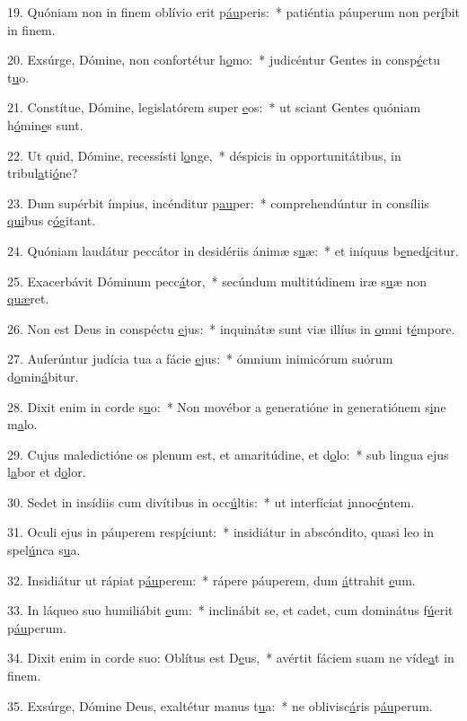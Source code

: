 19. Quóniam non in finem oblívio erit p\uline{áu}peris:~* patiéntia páuperum non per\uline{í}bit in f\uline{i}nem.\par 
20. Exsúrge, Dómine, non confortétur h\uline{o}mo:~* judicéntur Gentes in consp\uline{é}ctu t\uline{u}o.\par 
21. Constítue, Dómine, legislatórem super \uline{e}os:~* ut sciant Gentes quóniam h\uline{ó}min\uline{e}s sunt.\par 
22. Ut quid, Dómine, recessísti l\uline{o}nge,~* déspicis in opportunitátibus, in tribul\uline{a}ti\uline{ó}ne?\par 
23. Dum supérbit ímpius, incénditur p\uline{au}per:~* comprehendúntur in consíliis \uline{qui}bus c\uline{ó}gitant.\par 
24. Quóniam laudátur peccátor in desidériis ánimæ s\uline{u}æ:~* et iníquus b\uline{e}ned\uline{í}citur.\par 
25. Exacerbávit Dóminum pecc\uline{á}tor,~* secúndum multitúdinem iræ s\uline{u}æ non \uline{quæ}ret.\par 
26. Non est Deus in conspéctu \uline{e}jus:~* inquinátæ sunt viæ illíus in \uline{o}mni t\uline{é}mpore.\par 
27. Auferúntur judícia tua a fácie \uline{e}jus:~* ómnium inimicórum suórum d\uline{o}min\uline{á}bitur.\par 
28. Dixit enim in corde s\uline{u}o:~* Non movébor a generatióne in generatiónem s\uline{i}ne m\uline{a}lo.\par 
29. Cujus maledictióne os plenum est, et amaritúdine, et d\uline{o}lo:~* sub lingua ejus l\uline{a}bor et d\uline{o}lor.\par 
30. Sedet in insídiis cum divítibus in occ\uline{ú}ltis:~* ut interfíciat \uline{i}nnoc\uline{é}ntem.\par 
31. Oculi ejus in páuperem resp\uline{í}ciunt:~* insidiátur in abscóndito, quasi leo in spel\uline{ú}nca s\uline{u}a.\par 
32. Insidiátur ut rápiat p\uline{áu}perem:~* rápere páuperem, dum \uline{á}ttrahit \uline{e}um.\par 
33. In láqueo suo humiliábit \uline{e}um:~* inclinábit se, et cadet, cum dominátus f\uline{ú}erit p\uline{áu}perum.\par 
34. Dixit enim in corde suo: Oblítus est D\uline{e}us,~* avértit fáciem suam ne víde\uline{a}t in f\uline{i}nem.\par 
35. Exsúrge, Dómine Deus, exaltétur manus t\uline{u}a:~* ne oblivisc\uline{á}ris p\uline{áu}perum.\par 
